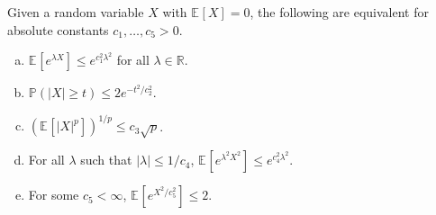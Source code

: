 \begin{lemma}\label{pf-lma:sub-Gaussian}
	Given a random variable \(X\) with \(\mathbb{E}_{}\left[X \right] =0\), the following are equivalent for absolute constants \(c_1, \dots , c_5 > 0\).
	\begin{enumerate}[(a)]
		\item\label{pf-lma:sub-Gaussian-a} \(\mathbb{E}_{}\left[e^{\lambda X} \right] \leq e^{c_1^2 \lambda ^2}\) for all \(\lambda \in \mathbb{R} \).
		\item\label{pf-lma:sub-Gaussian-b} \(\mathbb{P} (\vert X \vert \geq t) \leq 2 e^{- t^2 / c_2^2}\).
		\item\label{pf-lma:sub-Gaussian-c} \(\left( \mathbb{E}_{}\left[\vert X \vert ^p \right] \right) ^{1 / p} \leq c_3 \sqrt{p}  \).
		\item\label{pf-lma:sub-Gaussian-d} For all \(\lambda \) such that \(\vert \lambda  \vert \leq 1 / c_4 \), \(\mathbb{E}_{}\left[e^{\lambda ^2 X^2} \right] \leq e^{c_4^2 \lambda ^2} \).
		\item\label{pf-lma:sub-Gaussian-e} For some \(c_5 < \infty \), \(\mathbb{E}_{}\left[e^{X^2 / c_5^2}  \right] \leq 2\).
	\end{enumerate}
\end{lemma}
